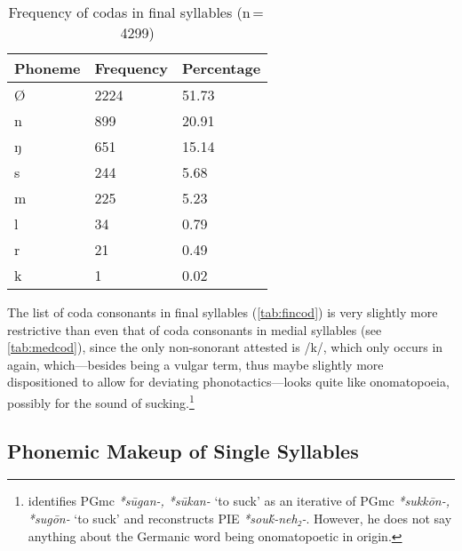 \begin{table}[pth]\centering
\caption[Frequency of codas in final syllables]{Frequency of codas in final syllables (n\,=\,4299)}
\begin{tabu} to 0.5\textwidth{X X[c] X[c]}
\tableheaderfont\toprule
Phoneme
	& Frequency
	& Percentage
	\\
	
\toprule

Ø
	& 2224
	& 51.73\pct
	\\

\midrule

n
	& 899
	& 20.91\pct
	\\

ŋ
	& 651
	& 15.14\pct
	\\

s
	& 244
	& 5.68\pct
	\\

m
	& 225
	& 5.23\pct
	\\

l
	& 34
	& 0.79\pct
	\\

r
	& 21
	& 0.49\pct
	\\

k
	& 1
	& 0.02\pct
	\\

\bottomrule
\end{tabu}
\label{tab:fincod}
\end{table}

The list of coda consonants in final syllables (\autoref{tab:fincod}) is very 
slightly more restrictive than even that of coda consonants in medial syllables
(see \autoref{tab:medcod}), since the only non-sonorant attested is /k/, which 
only occurs in  again, which---besides being a 
vulgar term, thus maybe slightly more dispositioned to allow for deviating 
phonotactics---looks quite like onomatopoeia, possibly for the sound of 
sucking.\footnote{\citet[489--490]{kroonen2013} identifies PGmc \textit{*sūgan-,
*sūkan-} `to suck' as an iterative of PGmc \textit{*sukkōn-, *sugōn-} `to suck' 
and reconstructs PIE \textit{*souḱ-neh₂-}. However, he does not say anything 
about the Germanic word being onomatopoetic in origin.}

\subsection{Phonemic Makeup of Single Syllables}

